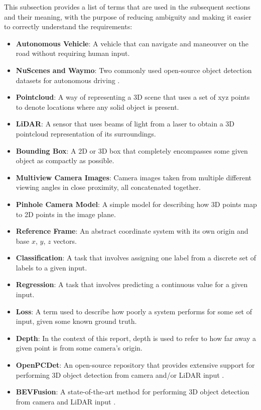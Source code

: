 \documentclass[12pt]{article}
\begin{document}
This subsection provides a list of terms that are used in the subsequent
sections and their meaning, with the purpose of reducing ambiguity and making it
easier to correctly understand the requirements:

\begin{itemize}
\item \textbf{Autonomous Vehicle}: A vehicle that can navigate and maneouver on the road without requiring human input.
\item \textbf{NuScenes and Waymo}: Two commonly used open-source object detection datasets for autonomous driving \cite{caesar2020nuscenes} \cite{sun2020scalability}.
\item \textbf{Pointcloud}: A way of representing a 3D scene that uses a set of xyz points to denote locations where any solid object is present.
\item \textbf{LiDAR}: A sensor that uses beams of light from a laser to obtain a 3D pointcloud representation of its surroundings.
\item \textbf{Bounding Box}: A 2D or 3D box that completely encompasses some given object as compactly as possible.
\item \textbf{Multiview Camera Images}: Camera images taken from multiple different viewing angles in close proximity, all concatenated together.
\item \textbf{Pinhole Camera Model}: A simple model for describing how 3D points map to 2D points in the image plane.
\item \textbf{Reference Frame}: An abstract coordinate system with its own origin and base $x$, $y$, $z$ vectors.
\item \textbf{Classification}: A task that involves assigning one label from a discrete set of labels to a given input.
\item \textbf{Regression}: A task that involves predicting a continuous value for a given input.
\item \textbf{Loss}: A term used to describe how poorly a system performs for some set of input, given some known ground truth.
\item \textbf{Depth}: In the context of this report, depth is used to refer to how far away a given point is from some camera's origin.
\item \textbf{OpenPCDet}: An open-source repository that provides extensive support for performing 3D object detection from camera and/or LiDAR input \cite{openpcdet2020}.
\item \textbf{BEVFusion}: A state-of-the-art method for performing 3D object detection from camera and LiDAR input \cite{liang2022bevfusion}.
\end{itemize}
\end{document}
